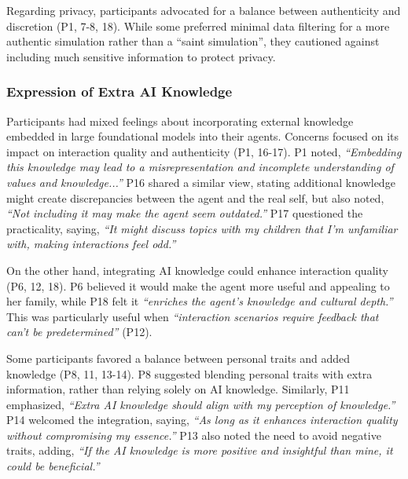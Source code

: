 
Regarding privacy, participants advocated for a balance between authenticity and discretion (P1, 7-8, 18). While some preferred minimal data filtering for a more authentic simulation rather than a ``saint simulation'', they cautioned against including much sensitive information to protect privacy. 

\subsubsection{Expression of Extra AI Knowledge} \label{ai knowledge}

Participants had mixed feelings about incorporating external knowledge embedded in large foundational models into their agents. Concerns focused on its impact on interaction quality and authenticity (P1, 16-17). P1 noted, \textit{``Embedding this knowledge may lead to a misrepresentation and incomplete understanding of values and knowledge...''} P16 shared a similar view, stating additional knowledge might create discrepancies between the agent and the real self, but also noted, \textit{``Not including it may make the agent seem outdated.''} P17 questioned the practicality, saying, \textit{``It might discuss topics with my children that I'm unfamiliar with, making interactions feel odd.''}

On the other hand, integrating AI knowledge could enhance interaction quality (P6, 12, 18). P6 believed it would make the agent more useful and appealing to her family, while P18 felt it \textit{``enriches the agent's knowledge and cultural depth.''} This was particularly useful when \textit{``interaction scenarios require feedback that can't be predetermined''} (P12).

Some participants favored a balance between personal traits and added knowledge (P8, 11, 13-14). P8 suggested blending personal traits with extra information, rather than relying solely on AI knowledge. Similarly, P11 emphasized, \textit{``Extra AI knowledge should align with my perception of knowledge.''} P14 welcomed the integration, saying, \textit{``As long as it enhances interaction quality without compromising my essence.''} P13 also noted the need to avoid negative traits, adding, \textit{``If the AI knowledge is more positive and insightful than mine, it could be beneficial.''} 

